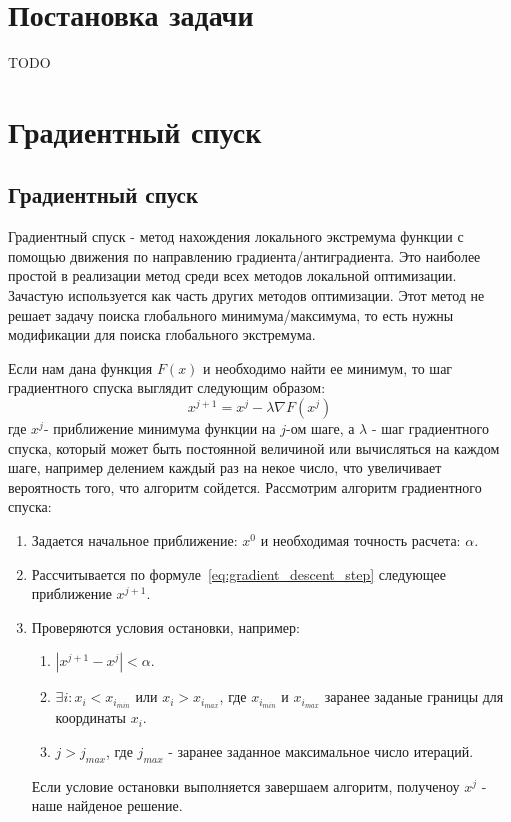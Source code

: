 \documentclass[12pt]{report}
\begin{document}
  \chapter{Постановка задачи}
  {TODO}

  \chapter{Градиентный спуск}
  \section{Градиентный спуск}

  Градиентный спуск - метод нахождения локального экстремума функции с помощью
  движения по направлению градиента/антиградиента. Это наиболее простой
  в реализации метод среди всех методов локальной оптимизации. Зачастую
  используется как часть других методов оптимизации. Этот метод не решает задачу
  поиска глобального минимума/максимума, то есть нужны модификации для поиска
  глобального экстремума.

  Если нам дана функция $F(x)$ и необходимо найти ее минимум, то шаг градиентного
  спуска выглядит следующим образом:
  \begin{equation} \label{eq:gradient_descent_step}
    x^{j+1}=x^j- \lambda \nabla F(x^j)
  \end{equation}
  где $x^j$- приближение минимума функции на $j$-ом шаге, а $\lambda$ - шаг
  градиентного спуска, который может быть постоянной величиной или вычисляться
  на каждом шаге, например делением каждый раз на некое число, что увеличивает
  вероятность того, что алгоритм сойдется.
  Рассмотрим алгоритм градиентного спуска:
  \begin{enumerate}
    \item
    Задается начальное приближение: $x^0$ и необходимая точность расчета: $\alpha$.
    \item
    Рассчитывается по формуле~\ref{eq:gradient_descent_step} следующее приближение $x^{j+1}$.
    \item
    Проверяются условия остановки, например:
    \begin{enumerate}
      \item
      $|x^{j+1}-x^j| < \alpha$.
      \item
      $\exists i: x_i < x_{i_{min}}$ или $x_i > x_{i_{max}}$, где $x_{i_{min}}$ и $x_{i_{max}}$
      заранее заданые границы для координаты $x_i$.
      \item
      $j>j_{max}$, где $j_{max}$ - заранее заданное максимальное число итераций.
    \end{enumerate}
    Если условие остановки выполняется завершаем алгоритм, полученоу $x^j$ - наше найденое решение.
  \end{enumerate}
\end{document}
